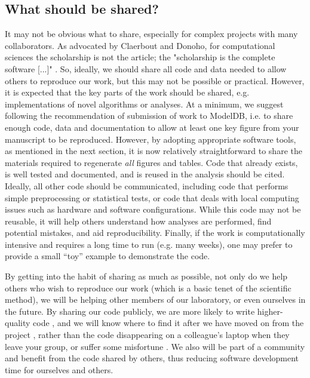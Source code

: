 \documentclass[11pt]{article}
\begin{document}
\subsection*{What should be shared?}

It may not be obvious what to share, especially for complex projects
with many collaborators.  As advocated by Claerbout and Donoho, for
computational sciences the scholarship is not the article; the
"scholarship is the complete software [...]"
\cite{claerbout_electronic_1992,donoho_invitation_2010}.  So, ideally,
we should share all code and data needed to allow others to
reproduce our work, but this may not be possible or practical.
However, it is expected that the key parts of the work should be shared,
e.g. implementations of novel algorithms or analyses.  At a minimum,
we suggest following the recommendation of submission of work to
ModelDB\cite{modeldb}, i.e. to share enough code, data and
documentation to allow at least one key figure from your manuscript to
be reproduced.  However, by adopting appropriate software tools, as
mentioned in the next section, it is now relatively straightforward to
share the materials required to regenerate \textit{all} figures and
tables.  Code that already exists, is well tested and documented, and is reused 
in the analysis should be cited. Ideally, all other code should be 
communicated, including code that performs simple
preprocessing or statistical tests, or code that deals with local
computing issues such as hardware and software configurations. 
While this code may not be reusable, it will help others understand how
analyses are performed, find potential mistakes, and aid reproducibility. 
Finally, if the work is computationally intensive and requires a long
time to run (e.g. many weeks), one may prefer to provide a small ``toy''
example to demonstrate the code.

By getting into the habit of sharing as much as possible, not only do
we help others who wish to reproduce our work (which is a basic tenet
of the scientific method), we will be helping other members of our
laboratory, or even ourselves in the future.  By sharing our code
publicly, we are more likely to write higher-quality code
\cite{Easterbrook2014}, and we will know where to find it after we
have moved on from the project \cite{Halchenko2015}, rather than the
code disappearing on a colleague's laptop when they leave your group,
or suffer some misfortune \cite{Berg2016}.  We also will be part of a
community and benefit from the code shared by others, thus reducing
software development time for ourselves and others.
\end{document}
